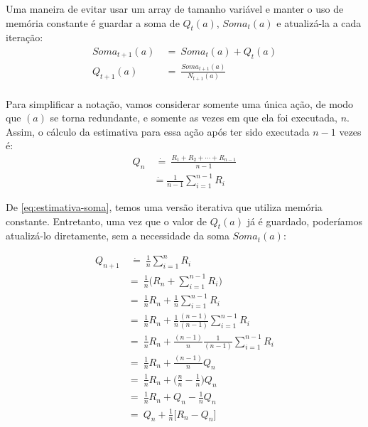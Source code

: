 \documentclass{article}
\begin{document}
        Uma maneira de evitar usar um array de tamanho variável e manter o uso de memória constante é guardar a soma de $Q_t(a)$, $Soma_t(a)$ e atualizá-la a cada iteração:
        \begin{equation}
        \label{eq:estimativa-soma}
        \begin{split}
            Soma_{t+1}(a) & \ = \ Soma_t(a) + Q_t(a) \\
            Q_{t+1}(a) & \ = \ \frac{Soma_{t+1}(a)}{N_{t+1}(a)}  \\
        \end{split}
        \end{equation}

        Para simplificar a notação, vamos considerar somente uma única ação, de modo que $(a)$ se torna redundante, e somente as vezes em que ela foi executada, $n$. Assim, o cálculo da estimativa para essa ação após ter sido executada $n-1$ vezes é:
        \begin{equation}
        \begin{split}
            Q_n & \ \dot{=} \ \frac{R_1 + R_2 + \cdots + R_{n-1}}{n - 1}\\
            & \dot{=} \frac{1}{n-1} \sum_{i=1}^{n-1} R_i
        \end{split}
        \end{equation}
        
        De \eqref{eq:estimativa-soma}, temos uma versão iterativa que utiliza memória constante. Entretanto, uma vez que o valor de $Q_t(a)$ já é guardado, poderíamos atualizá-lo diretamente, sem a necessidade da soma $Soma_t(a)$:
        
        \begin{subequations}
        \begin{align}
            Q_{n+1} & \ \dot{=} \ \frac{1}{n} \sum_{i=1}^{n} R_i\\
            & = \ \frac{1}{n} \Bigg( R_n + \sum_{i=1}^{n-1} R_i \Bigg) \nonumber\\
            & = \ \frac{1}{n} R_n + \frac{1}{n} \sum_{i=1}^{n-1} R_i \nonumber\\
            & = \ \frac{1}{n} R_n + \frac{1}{n} \frac{(n-1)}{(n-1)} \sum_{i=1}^{n-1} R_i \nonumber\\
            & = \ \frac{1}{n} R_n + \frac{(n-1)}{n} \frac{1}{(n-1)} \sum_{i=1}^{n-1} R_i \nonumber\\
            & = \ \frac{1}{n} R_n + \frac{(n-1)}{n} Q_n \nonumber\\
            & = \ \frac{1}{n} R_n + \Bigg( \frac{n}{n} - \frac{1}{n} \Bigg) Q_n \nonumber\\
            & = \ \frac{1}{n} R_n + Q_n - \frac{1}{n} Q_n \nonumber\\
            \label{eq:estimativa-qn}
            & = \ Q_n + \frac{1}{n} \Big[ R_n - Q_n \Big]
        \end{align}
        \end{subequations}
        
\end{document}

